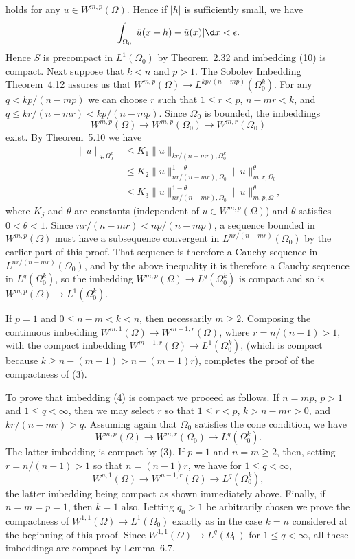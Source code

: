 \begin{para}
  holds for any $u\in W^{m,p}(\Omega)$. Hence if $|h|$ is sufficiently small,
  we have
  \[\int_{\Omega_0} |\tilde{u}(x+h) - \tilde{u}(x)| \d x < \epsilon.\]
  Hence $S$ is precompact in $L^1(\Omega_0)$ by Theorem~2.32 and imbedding (10)
  is compact. Next suppose that $k<n$ and $p>1$.
  The Sobolev Imbedding Theorem~4.12 assures us that $W^{m,p}(\Omega)\to L^{kp/(n-mp)}(\Omega_0^k)$.
  For any $q<kp/(n-mp)$ we can choose $r$ such that $1\leq r<p$, $n-mr<k$,
  and $q\leq kr/(n-mr)<kp/(n-mp)$. Since $\Omega_0$ is bounded, the imbeddings
  \[ W^{m,p}(\Omega) \to W^{m,p}(\Omega_0) \to W^{m,r}(\Omega_0) \]
  exist. By Theorem~5.10 we have
  \begin{align*}
    \|u\|_{q,\Omega_0^k}
    & \leq K_1 \|u\|_{kr/(n-mr), \Omega_0^k} \\
    & \leq K_2 \|u\|_{nr/(n-mr), \Omega_0}^{1-\theta} \|u\|_{m,r,\Omega_0}^\theta \\
    & \leq K_3 \|u\|_{nr/(n-mr), \Omega_0}^{1-\theta} \|u\|_{m,p,\Omega}^\theta,
  \end{align*}
  where $K_j$ and $\theta$ are constants (independent of $u\in W^{m,p}(\Omega)$)
  and $\theta$ satisfies $0<\theta<1$.
  Since $nr/(n-mr) < np/(n-mp)$, a sequence bounded in $W^{m,p}(\Omega)$
  must have a subsequence convergent in $L^{nr/(n-mr)}(\Omega_0)$ by the earlier
  part of this proof. That sequence is therefore a Cauchy sequence in $L^{nr/(n-mr)}(\Omega_0)$,
  and by the above inequality it is therefore a Cauchy sequence in $L^q(\Omega_0^k)$,
  so the imbedding $W^{m,p}(\Omega) \to L^q(\Omega_0^k)$ is compact and so is
  $W^{m,p}(\Omega) \to L^1(\Omega_0^k)$.

  If $p=1$ and $0\leq n-m<k<n$, then necessarily $m\geq 2$.
  Composing the continuous imbedding $W^{m,1}(\Omega)\to W^{m-1,r}(\Omega)$,
  where $r = n/(n-1) > 1$, with the compact imbedding $W^{m-1,r}(\Omega)\to L^1(\Omega_0^k)$,
  (which is compact because $k\geq n-(m-1) > n-(m-1)r$),
  completes the proof of the compactness of (3).

  To prove that imbedding (4) is compact we proceed as follows. If $n=mp$,
  $p>1$ and $1\leq q<\infty$, then we may select $r$ so that $1\leq r<p$,
  $k>n-mr>0$, and $kr/(n-mr)>q$. Assuming again that $\Omega_0$ satisfies
  the cone condition, we have
  \[ W^{m,p}(\Omega) \to W^{m,r}(\Omega_0) \to L^q(\Omega_0^k). \]
  The latter imbedding is compact by (3).
  If $p=1$ and $n=m\geq 2$, then, setting $r=n/(n-1)>1$ so that $n=(n-1)r$,
  we have for $1\leq q<\infty$,
  \[W^{n,1}(\Omega) \to W^{n-1,r}(\Omega) \to L^q(\Omega_0^k), \]
  the latter imbedding being compact as shown immediately above.
  Finally, if $n=m=p=1$, then $k=1$ also. Letting $q_0>1$ be arbitrarily chosen
  we prove the compactness of $W^{1,1}(\Omega) \to L^1(\Omega_0)$ exactly as in the case
  $k=n$ considered at the beginning of this proof.
  Since $W^{1,1}(\Omega)\to L^q(\Omega_0)$ for $1\leq q<\infty$,
  all these imbeddings are compact by Lemma~6.7.
\end{para}


